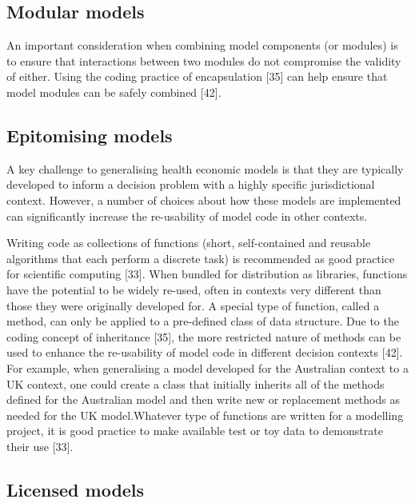 \documentclass[
]{article}
\begin{document}
\hypertarget{modular-models}{%
\subsection{Modular models}\label{modular-models}}

An important consideration when combining model components (or modules) is to ensure that interactions between two modules do not compromise the validity of either. Using the coding practice of encapsulation {[}35{]} can help ensure that model modules can be safely combined {[}42{]}.

\hypertarget{epitomising-models}{%
\subsection{Epitomising models}\label{epitomising-models}}

A key challenge to generalising health economic models is that they are typically developed to inform a decision problem with a highly specific jurisdictional context. However, a number of choices about how these models are implemented can significantly increase the re-usability of model code in other contexts.

Writing code as collections of functions (short, self-contained and reusable algorithms that each perform a discrete task) is recommended as good practice for scientific computing {[}33{]}. When bundled for distribution as libraries, functions have the potential to be widely re-used, often in contexts very different than those they were originally developed for. A special type of function, called a method, can only be applied to a pre-defined class of data structure. Due to the coding concept of inheritance {[}35{]}, the more restricted nature of methods can be used to enhance the re-usability of model code in different decision contexts {[}42{]}. For example, when generalising a model developed for the Australian context to a UK context, one could create a class that initially inherits all of the methods defined for the Australian model and then write new or replacement methods as needed for the UK model.Whatever type of functions are written for a modelling project, it is good practice to make available test or toy data to demonstrate their use {[}33{]}.

\hypertarget{licensed-models}{%
\subsection{Licensed models}\label{licensed-models}}
\end{document}
